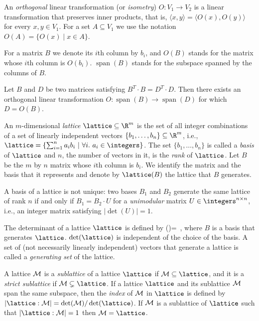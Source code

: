 \begin{description}
An {\em orthogonal} linear transformation (or {\em isometry}) $O : V_1
\rightarrow V_2$ is a linear transformation that preserves inner
products, that is, $\langle x, y\rangle = \langle O(x), O(y)\rangle$ for
every $x,y \in V_1$. For a set $A \subseteq V_1$ we use the notation
$O(A) = \{ O(x) \mid x \in A\}$.

For a matrix $B$ we denote its $i$th column by $b_i$, and $O(B)$ stands
for the matrix whose $i$th column is $O(b_i)$.
${\mathop{\mathrm{span}}}(B)$ stands for the subspace spanned
by the columns of $B$.

Let $B$ and $D$ be two matrices satisfying $B^T \cdot B = D^T \cdot D$.
Then there exists an orthogonal linear transformation
$O:{\mathop{\mathrm{span}}}(B) \rightarrow {\mathop{\mathrm{span}}}(D)$
for which $D = O(B)$.

An $m$-dimensional {\em lattice} $\lattice \subseteq \R^m$ is the set of
all integer combinations of a set of linearly independent vectors
$\{b_1,\ldots,b_n\} \subseteq \R^m $, i.e.,
$\lattice=\{\sum_{i=1}^{n}{a_i b_i}~|~\forall i.~a_i \in \integers\}$. The set
$\{b_1,\ldots,b_n\}$ is called a {\em basis} of $\lattice$ and $n$, the
number of vectors in it, is the {\em rank} of $\lattice$. Let $B$ be the
$m$ by $n$ matrix whose $i$th column is $b_i$. We identify the matrix and
the basis that it represents and denote by $\lattice(B)$ the lattice that
$B$ generates.



A basis of a lattice is not unique: two bases $B_1$
and $B_2$ generate the same lattice of rank $n$ if and only if $B_1 = B_2
\cdot U$ for a {\em unimodular} matrix $U \in \integers^{n \times n}$,
i.e., an integer matrix satisfying $|\det(U)|=1$.

The determinant of a lattice $\lattice$ is defined by
\beq
\det(\lattice)=
\,,
where $B$ is a basis that generates $\lattice$.
$\det(\lattice)$ is independent of the choice of the basis. A
set of (not necessarily linearly independent) vectors that generate a
lattice is called a {\em generating set} of the lattice.

A lattice ${\cal M}$ is a {\em sublattice} of a lattice $\lattice$ if
${\cal M} \subseteq \lattice$, and it is a {\em strict sublattice} if
${\cal M} \subsetneq \lattice$. If a lattice $\lattice$ and its
sublattice ${\cal M}$ span the same subspace, then the {\em index} of
${\cal M}$ in $\lattice$ is defined by $|\lattice : {\cal M}| =
\det({\cal M})/\det(\lattice)$. If ${\cal M}$ is a sublattice of
$\lattice$ such that $|\lattice : {\cal M}|=1$ then ${\cal M}=\lattice$.


\end{description}
